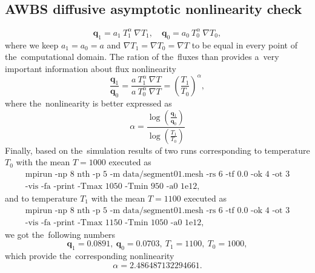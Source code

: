 \documentclass[review]{elsarticle}
\newcommand{\vect}[1]{\boldsymbol{#1}}
\begin{document}
\subsection{AWBS diffusive asymptotic nonlinearity check}\label{sec:AWBS_nonlinearity_check}
\begin{equation}
  \vect{q}_{1} = a_1~T_1^{\alpha}~\nabla T_1 ,\quad 
  \vect{q}_{0} = a_0~T_0^{\alpha}~\nabla T_0 , 
  \nonumber 
\end{equation}
where we keep $a_1 = a_0 = a$ and 
$\nabla T_1 = \nabla T_0 = \nabla T$ to be equal in every point of 
the~computational domain. 
The ration of the~fluxes than provides a~very important information about
flux nonlinearity
\begin{equation}    
  \frac{\vect{q}_1}{\vect{q}_0} = 
  \frac{a~T_1^{\alpha}~\nabla T}{a~T_0^{\alpha}~\nabla T} = 
  \left( \frac{T_1}{T_0} \right)^\alpha ,
  \nonumber
\end{equation}
where the~nonlinearity is better expressed as
\begin{equation}
  \alpha = \frac{\log\left( \frac{\vect{q}_1}{\vect{q}_0} \right)}
  {\log\left( \frac{T_1}{T_0} \right)}
  \label{eq:AWBS_nonlinearity}
\end{equation}
Finally, based on the~simulation results of two runs corresponding to
temperature $T_0$ with the mean $T = 1000$ executed as
\begin{multline}
\text{mpirun -np 8 nth -p 5 -m data/segment01.mesh -rs 6 -tf 0.0 -ok 4 -ot 3} 
\\
\text{-vis -fa -print -Tmax 1050 -Tmin 950 -a0 1e12} ,
\nonumber
\end{multline}
and to temperature $T_1$ with the mean $T = 1100$ executed as
\begin{multline}
\text{mpirun -np 8 nth -p 5 -m data/segment01.mesh -rs 6 -tf 0.0 -ok 4 -ot 3} 
\\
\text{-vis -fa -print -Tmax 1150 -Tmin 1050 -a0 1e12} ,
\nonumber
\end{multline}
we got the~following numbers 
\begin{equation}
  \vect{q}_1 = 0.0891,~\vect{q}_0 = 0.0703,~T_1 = 1100,~T_0 = 1000, 
  \nonumber
\end{equation}
which provide the~corresponding nonlinearity
\begin{equation}
  \alpha = 2.486487132294661 .
  \label{eq:AWBS_nonlinearity_computed}
\end{equation}
\end{document}
